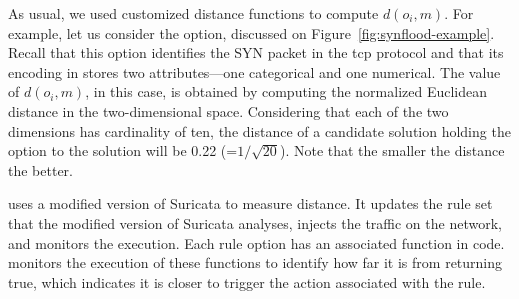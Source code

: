 \documentclass[conference]{IEEEtran}
\begin{document}
As usual, we used customized distance functions to compute $d(o_i,
m)$. For example, let us consider the  option, discussed
on Figure~\ref{fig:synflood-example}. Recall that this option
identifies the SYN packet in the tcp protocol and that its encoding in
\tname{} stores two attributes---one categorical and one
numerical. The value of $d(o_i, m)$, in this case, is obtained by
computing the normalized Euclidean distance in the two-dimensional
space. Considering that each of the two dimensions has cardinality of
ten, the distance of a candidate solution holding the option
 to the solution will be 0.22
(=$1/\sqrt{20}$). Note that the smaller the distance the better.

\tname{} uses a modified version of Suricata to measure distance. It
updates the rule set that the modified version of Suricata analyses,
injects the traffic on the network, and monitors the execution. Each
rule option has an associated  function in code. \tname{}
monitors the execution of these functions to identify how far it is
from returning true, which indicates it is closer to trigger the
action associated with the rule. 

\end{document}
